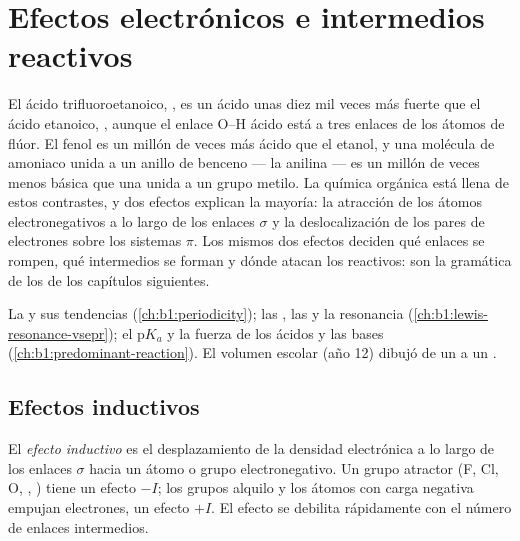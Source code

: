\chapter{Efectos electrónicos e intermedios reactivos}\label{ch:b1:electronic-effects}

El ácido trifluoroetanoico, , es un ácido unas diez mil veces
más fuerte que el ácido etanoico, , aunque el enlace O--H
ácido está a tres enlaces de los átomos de flúor. El fenol es un millón de
veces más ácido que el etanol, y una molécula de amoniaco unida a un
anillo de benceno --- la anilina --- es un millón de veces menos básica
que una unida a un grupo metilo. La química orgánica está llena de estos
contrastes, y dos efectos explican la mayoría: la atracción de los
átomos electronegativos a lo largo de los enlaces $\sigma$ y la
deslocalización de los pares de electrones sobre los sistemas $\pi$. Los
mismos dos efectos deciden qué enlaces se rompen, qué intermedios se
forman y dónde atacan los reactivos: son la gramática de los  de los capítulos siguientes.

\begin{recall}
La  y sus tendencias (\cref{ch:b1:periodicity}); las
, las  y la resonancia
(\cref{ch:b1:lewis-resonance-vsepr}); el $\mathrm{p}K_a$ y la fuerza de
los ácidos y las bases (\cref{ch:b1:predominant-reaction}). El volumen
escolar (año 12) dibujó  de un  a un
.
\end{recall}

\section{Efectos inductivos}

\begin{definition}\label{def:b1:electronic-effects:inductive}
El \emph{efecto inductivo} es el desplazamiento de
la densidad electrónica a lo largo de los enlaces $\sigma$ hacia un átomo
o grupo electronegativo. Un grupo atractor (F, Cl, O, ,
) tiene un efecto $-I$; los grupos alquilo y los átomos con carga
negativa empujan electrones, un efecto $+I$. El efecto se debilita
rápidamente con el número de enlaces intermedios.
\end{definition}


